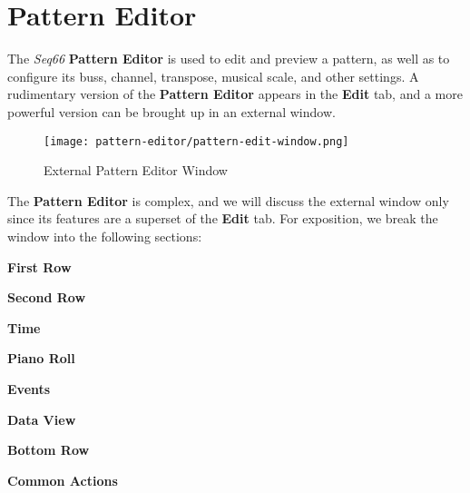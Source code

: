 %
%

\section{Pattern Editor}
\label{sec:pattern_editor}

   The \textsl{Seq66} \textbf{Pattern Editor} is used to edit and preview a
   pattern, as well as to configure its buss, channel, transpose, musical
   scale, and other settings.
   A rudimentary version of the \textbf{Pattern Editor} appears in the
   \textbf{Edit} tab, and a more powerful version can be brought up in an
   external window.

\begin{figure}[H]
   \centering 
   \texttt{[image: pattern-editor/pattern-edit-window.png]}
   \caption{External Pattern Editor Window}
   \label{fig:pattern_editor_window}
\end{figure}
  
   The \textbf{Pattern Editor} is complex, and we will discuss the external
   window only since its features are a superset of the \textbf{Edit} tab.
   For exposition, we break the window into the following sections:

   \begin{enumber}
      \item \textbf{First Row}
      \item \textbf{Second Row}
      \item \textbf{Time}
      \item \textbf{Piano Roll}
      \item \textbf{Events}
      \item \textbf{Data View}
      \item \textbf{Bottom Row}
      \item \textbf{Common Actions}
   \end{enumber}

